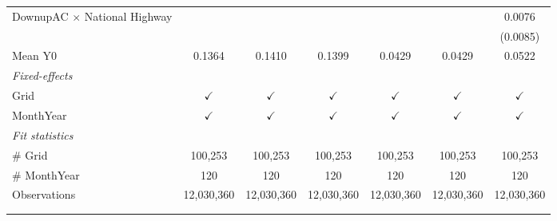 \begin{table}[htbp]
\begin{tabular}{lcccccc}
      DownupAC $\times$ National Highway                         &               &               &               &               &               & 0.0076\\   
                                                                 &               &               &               &               &               & (0.0085)\\   
      \hline Mean Y0                                             & 0.1364        & 0.1410        & 0.1399        & 0.0429        & 0.0429        & 0.0522\\  
      \midrule
      \emph{Fixed-effects}\\
      Grid                                                       & $\checkmark$  & $\checkmark$  & $\checkmark$  & $\checkmark$  & $\checkmark$  & $\checkmark$\\   
      MonthYear                                                  & $\checkmark$  & $\checkmark$  & $\checkmark$  & $\checkmark$  & $\checkmark$  & $\checkmark$\\   
      \midrule
      \emph{Fit statistics}\\
      \# Grid                                                    & 100,253       & 100,253       & 100,253       & 100,253       & 100,253       & 100,253\\  
      \# MonthYear                                               & 120           & 120           & 120           & 120           & 120           & 120\\  
      Observations                                               & 12,030,360    & 12,030,360    & 12,030,360    & 12,030,360    & 12,030,360    & 12,030,360\\  
      \midrule \midrule
                                                                 &               &               &               &               &               &  \tabularnewline 
      \\
   \end{tabular}
\end{table}


